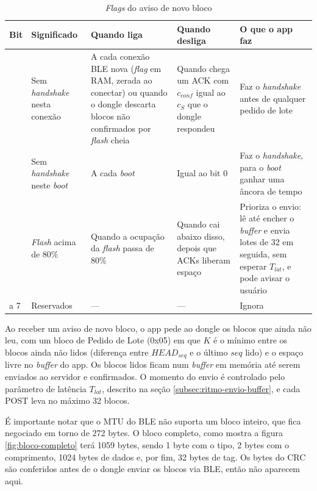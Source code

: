 \documentclass[
	12pt,
	article,			%
	oneside,
	a4paper,
	english,
	brazil				%
	]{abntex2}
\begin{document}
\begin{table}[H]
	\centering
	\caption{\textit{Flags} do aviso de novo bloco}
	\label{tab:flags-aviso-novo-bloco}
	\begin{tabular}{|>{\centering\arraybackslash}m{}|>{\raggedright\arraybackslash}m{}|>{\raggedright\arraybackslash}m{}|>{\raggedright\arraybackslash}m{}|>{\raggedright\arraybackslash}m{}|}
		\hline
		\textbf{Bit} & \textbf{Significado} & \textbf{Quando liga} & \textbf{Quando desliga} & \textbf{O que o app faz} \\
		\hline
		0 & Sem \textit{handshake} nesta conexão & A cada conexão BLE nova (\textit{flag} em RAM, zerada ao conectar) ou quando o dongle descarta blocos não confirmados por \textit{flash} cheia & Quando chega um ACK com $c_{conf}$ igual ao $c_{S}$ que o dongle respondeu & Faz o \textit{handshake} antes de qualquer pedido de lote \\
		\hline
		1 & Sem \textit{handshake} neste \textit{boot} & A cada \textit{boot} & Igual ao bit 0 & Faz o \textit{handshake}, para o \textit{boot} ganhar uma âncora de tempo \\
		\hline
		2 & \textit{Flash} acima de 80\% & Quando a ocupação da \textit{flash} passa de 80\% & Quando cai abaixo disso, depois que ACKs liberam espaço & Prioriza o envio: lê até encher o \textit{buffer} e envia lotes de 32 em seguida, sem esperar $T_{lat}$, e pode avisar o usuário \\
		\hline
		3 a 7 & Reservados & --- & --- & Ignora \\
		\hline
	\end{tabular}
\end{table}

Ao receber um aviso de novo bloco, o app pede ao dongle os blocos que ainda não leu, com um bloco de Pedido de Lote (0x05) em que $K$ é o mínimo entre os blocos ainda não lidos (diferença entre $HEAD_{seq}$ e o
último $seq$ lido) e o espaço livre no \textit{buffer} do app. Os blocos lidos ficam num \textit{buffer} em memória até serem enviados ao servidor e confirmados. O momento do envio é controlado pelo
parâmetro de latência $T_{lat}$, descrito na seção \ref{subsec:ritmo-envio-buffer}, e cada POST leva no máximo 32 blocos.

É importante notar que o MTU do BLE não suporta um bloco inteiro, que fica negociado em torno de 272 bytes. O bloco completo, como mostra a figura \ref{fig:bloco-completo} terá 1059 bytes, sendo 1 byte com o 
tipo, 2 bytes com o comprimento, 1024 bytes de dados e, por fim, 32 bytes de tag. Os bytes do CRC são conferidos antes de o dongle enviar os blocos via BLE, então não aparecem aqui.
\end{document}

